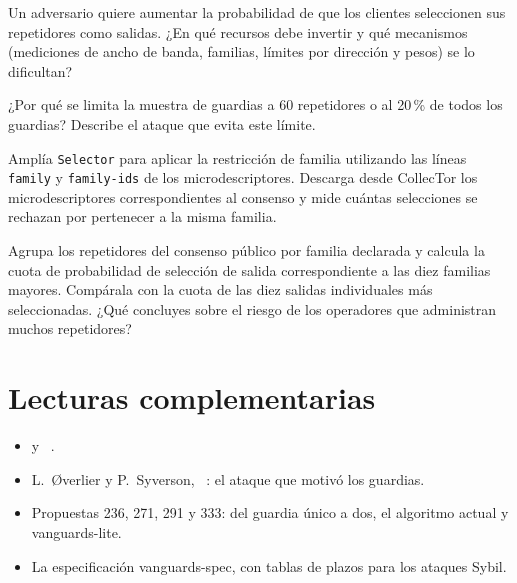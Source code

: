 \begin{esercizio}[2]\label{es:13-sybil}
Un adversario quiere aumentar la probabilidad de que los clientes seleccionen sus repetidores como salidas. ¿En qué recursos debe invertir y qué mecanismos (mediciones de ancho de banda, familias, límites por dirección y pesos) se lo dificultan?
\end{esercizio}

\begin{esercizio}[2]\label{es:13-campione}
¿Por qué se limita la muestra de guardias a 60 repetidores o al 20\,\% de todos los guardias? Describe el ataque que evita este límite.
\end{esercizio}

\begin{esercizio}[3]\label{es:13-famiglie}
Amplía \texttt{Selector} para aplicar la restricción de familia utilizando las líneas \texttt{family} y \texttt{family-ids} de los microdescriptores. Descarga desde CollecTor los microdescriptores correspondientes al consenso y mide cuántas selecciones se rechazan por pertenecer a la misma familia.
\end{esercizio}

\begin{esercizio}[3]\label{es:13-operatori}
Agrupa los repetidores del consenso público por familia declarada y calcula la cuota de probabilidad de selección de salida correspondiente a las diez familias mayores. Compárala con la cuota de las diez salidas individuales más seleccionadas. ¿Qué concluyes sobre el riesgo de los operadores que administran muchos repetidores?
\end{esercizio}

\section*{Lecturas complementarias}
\begin{itemize}
  \item {} y ~\cite{torspec}.
  \item L.~Øverlier y P.~Syverson, ~\cite{overlier2006locating}: el ataque que motivó los guardias.
  \item Propuestas 236, 271, 291 y 333: del guardia único a dos, el algoritmo actual y vanguards-lite.
  \item La especificación vanguards-spec, con tablas de plazos para los ataques Sybil.
\end{itemize}

